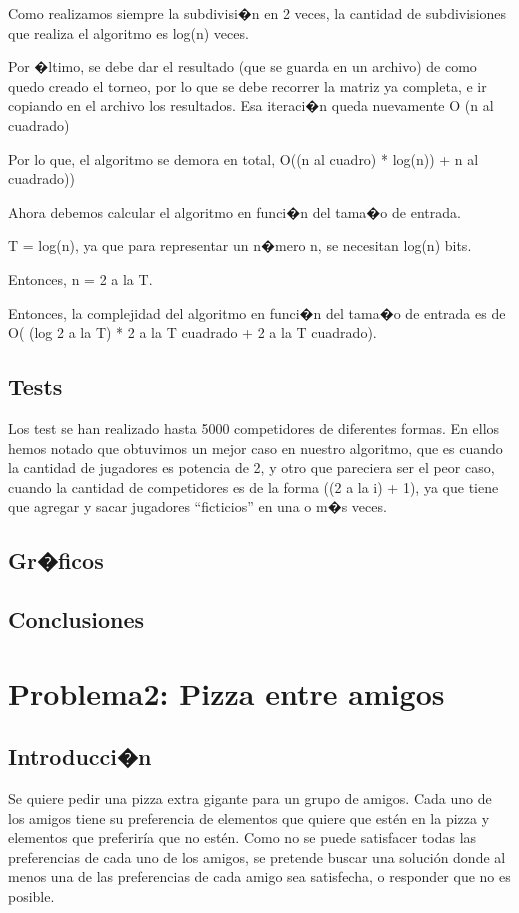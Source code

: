 \documentclass[11pt, a4paper, spanish]{article}
\begin{document}
	Como realizamos siempre la subdivisi�n en 2 veces, la cantidad de subdivisiones que realiza el algoritmo es log(n) veces.
	
	Por �ltimo, se debe dar el resultado (que se guarda en un archivo) de como quedo creado el torneo, por lo que se debe recorrer la matriz ya completa, e ir copiando en el archivo los resultados. Esa iteraci�n queda nuevamente O (n al cuadrado)
	
	Por lo que, el algoritmo se demora en total, O((n al cuadro)  * log(n)) + n al cuadrado))
	
	Ahora debemos calcular el algoritmo en funci�n del tama�o de entrada.
	
	T = log(n), ya que para representar un n�mero n, se necesitan log(n) bits.
	
	Entonces, n = 2 a la T.
	
	Entonces, la complejidad del algoritmo en funci�n del tama�o de entrada es de O( (log 2 a la T) * 2 a la T cuadrado + 2 a la T cuadrado).
	
	\subsection{Tests}
	
	Los test se han realizado hasta 5000 competidores de diferentes formas. En ellos hemos notado que obtuvimos un mejor caso en nuestro algoritmo, que es cuando la cantidad de jugadores es potencia de 2, y otro que pareciera ser el peor caso, cuando la cantidad de competidores es de la forma ((2 a la i) + 1), ya que tiene que agregar y sacar jugadores "`ficticios"' en una o m�s veces.
	
	\subsection{Gr�ficos}
	
	

	\subsection{Conclusiones}
\newpage

\section{Problema2: Pizza entre amigos}
\label{sec:problema2}
	\subsection{Introducci�n}
	Se quiere pedir una pizza extra gigante para un grupo de amigos. Cada uno de los amigos tiene su preferencia de elementos que quiere que est\'en en la pizza y elementos que preferir\'ia que no est\'en.
	Como no se puede satisfacer todas las preferencias de cada uno de los amigos, se pretende buscar una soluci\'on donde al menos una de las preferencias de cada amigo sea satisfecha, o responder que no es posible.
\end{document}
